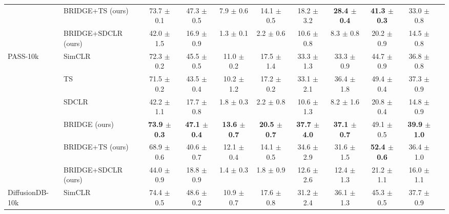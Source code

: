 \begin{table}[H]
\begin{adjustbox}{width=\textwidth}
\begin{tabular}{l l c c c c c c c c c}
 & BRIDGE+TS (ours) & 73.7 {\scriptsize$\pm$ 0.1} & 47.3 {\scriptsize$\pm$ 0.5} & 7.9 {\scriptsize$\pm$ 0.6} & 14.1 {\scriptsize$\pm$ 0.5} & 18.2 {\scriptsize$\pm$ 3.2} & \textbf{28.4 {\scriptsize$\pm$ 0.4}} & \textbf{41.3 {\scriptsize$\pm$ 0.3}} & 33.0 {\scriptsize$\pm$ 0.8} \\
 & BRIDGE+SDCLR (ours) & 42.0 {\scriptsize$\pm$ 1.5} & 16.9 {\scriptsize$\pm$ 0.9} & 1.3 {\scriptsize$\pm$ 0.1} & 2.2 {\scriptsize$\pm$ 0.6} & 10.6 {\scriptsize$\pm$ 0.8} & 8.3 {\scriptsize$\pm$ 0.8} & 20.2 {\scriptsize$\pm$ 0.9} & 14.5 {\scriptsize$\pm$ 0.8} \\
\midrule
PASS-10k & SimCLR & 72.3 {\scriptsize$\pm$ 0.2} & 45.5 {\scriptsize$\pm$ 0.5} & 11.0 {\scriptsize$\pm$ 0.2} & 17.5 {\scriptsize$\pm$ 1.4} & 33.3 {\scriptsize$\pm$ 1.3} & 33.3 {\scriptsize$\pm$ 0.9} & 44.7 {\scriptsize$\pm$ 0.9} & 36.8 {\scriptsize$\pm$ 0.8} \\
 & TS & 71.5 {\scriptsize$\pm$ 0.2} & 43.5 {\scriptsize$\pm$ 0.4} & 10.2 {\scriptsize$\pm$ 1.2} & 17.2 {\scriptsize$\pm$ 0.2} & 33.1 {\scriptsize$\pm$ 2.1} & 36.4 {\scriptsize$\pm$ 1.8} & 49.4 {\scriptsize$\pm$ 0.4} & 37.3 {\scriptsize$\pm$ 0.9} \\
 & SDCLR & 42.2 {\scriptsize$\pm$ 1.1} & 17.7 {\scriptsize$\pm$ 0.8} & 1.8 {\scriptsize$\pm$ 0.3} & 2.2 {\scriptsize$\pm$ 0.8} & 10.6 {\scriptsize$\pm$ 1.3} & 8.2 {\scriptsize$\pm$ 1.6} & 20.8 {\scriptsize$\pm$ 0.4} & 14.8 {\scriptsize$\pm$ 0.9} \\
 & BRIDGE (ours) & \textbf{73.9 {\scriptsize$\pm$ 0.3}} & \textbf{47.1 {\scriptsize$\pm$ 0.4}} & \textbf{13.6 {\scriptsize$\pm$ 0.7}} & \textbf{20.5 {\scriptsize$\pm$ 0.7}} & \textbf{37.7 {\scriptsize$\pm$ 4.0}} & \textbf{37.1 {\scriptsize$\pm$ 0.7}} & 49.1 {\scriptsize$\pm$ 0.5} & \textbf{39.9 {\scriptsize$\pm$ 1.0}} \\
 & BRIDGE+TS (ours) & 68.9 {\scriptsize$\pm$ 0.6} & 40.6 {\scriptsize$\pm$ 0.7} & 12.1 {\scriptsize$\pm$ 0.4} & 14.1 {\scriptsize$\pm$ 0.5} & 34.6 {\scriptsize$\pm$ 2.9} & 31.6 {\scriptsize$\pm$ 1.5} & \textbf{52.4 {\scriptsize$\pm$ 0.6}} & 36.4 {\scriptsize$\pm$ 1.0} \\
 & BRIDGE+SDCLR (ours) & 44.0 {\scriptsize$\pm$ 0.9} & 18.8 {\scriptsize$\pm$ 0.9} & 1.4 {\scriptsize$\pm$ 0.3} & 1.8 {\scriptsize$\pm$ 0.9} & 12.6 {\scriptsize$\pm$ 2.6} & 12.4 {\scriptsize$\pm$ 1.3} & 21.2 {\scriptsize$\pm$ 1.1} & 16.0 {\scriptsize$\pm$ 1.1} \\
\midrule
DiffusionDB-10k & SimCLR & 74.4 {\scriptsize$\pm$ 0.5} & 48.6 {\scriptsize$\pm$ 0.2} & 10.9 {\scriptsize$\pm$ 0.7} & 17.6 {\scriptsize$\pm$ 0.8} & 31.2 {\scriptsize$\pm$ 2.4} & 36.1 {\scriptsize$\pm$ 1.3} & 45.3 {\scriptsize$\pm$ 0.5} & 37.7 {\scriptsize$\pm$ 0.9} \\

\end{tabular}
\end{adjustbox}
\end{table}
